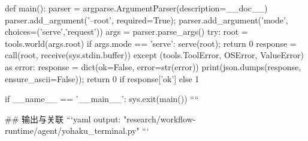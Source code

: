 def main():
    parser = argparse.ArgumentParser(description=__doc__)
    parser.add_argument('--root', required=True); parser.add_argument('mode', choices=('serve','request'))
    args = parser.parse_args()
    try:
        root = tools.world(args.root)
        if args.mode == 'serve': serve(root); return 0
        response = call(root, receive(sys.stdin.buffer))
    except (tools.ToolError, OSError, ValueError) as error:
        response = dict(ok=False, error=str(error))
    print(json.dumps(response, ensure_ascii=False)); return 0 if response['ok'] else 1


if __name__ == '__main__': sys.exit(main())
````

## 输出与关联
```yaml
output: "research/workflow-runtime/agent/yohaku_terminal.py"
```
